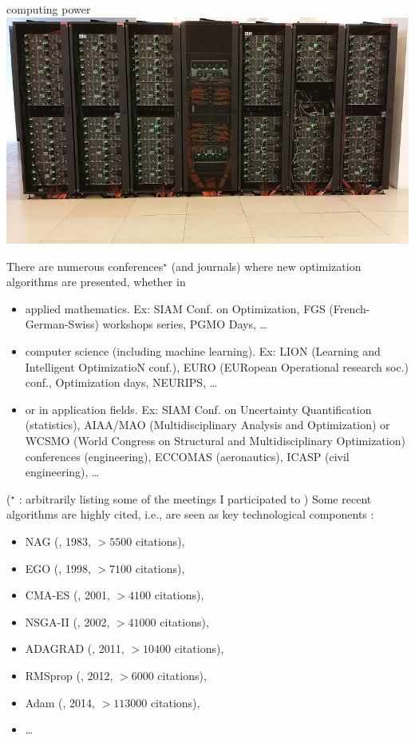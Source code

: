 \documentclass[12pt]{beamer}
\begin{document}
\begin{frame}[allowframebreaks]
\begin{minipage}[t]{0.2\textwidth}
\centering
computing power 
\\\vskip 0.2cm
\includegraphics[width=\textwidth]{Figures/supercomputer.jpg} 
\end{minipage} 
\newpage
There are numerous conferences$^\star$ (and journals) where new optimization algorithms are presented, whether in 
\begin{itemize}
\item applied mathematics. Ex: {\scriptsize SIAM Conf. on Optimization, FGS (French-German-Swiss) workshops series, PGMO Days, \ldots}
\item computer science (including machine learning). Ex: {\scriptsize LION (Learning and Intelligent OptimizatioN conf.), EURO (EURopean Operational research soc.) conf., Optimization days, NEURIPS, \ldots}
\item or in application fields. Ex: {\scriptsize SIAM Conf. on Uncertainty Quantification (statistics), AIAA/MAO (Multidisciplinary Analysis and Optimization) or WCSMO (World Congress on Structural and Multidisciplinary Optimization) conferences (engineering), ECCOMAS (aeronautics), ICASP (civil engineering), \ldots}
\end{itemize}
\hfill($^\star$ {\scriptsize : arbitrarily listing some of the meetings I participated to} )
\newpage
Some recent algorithms are highly cited, i.e., are seen as key technological components : 
\begin{itemize}
\item NAG (\cite{nesterov1983method}, 1983, $>5500$ citations),
\item EGO (\cite{jones1998efficient}, 1998, $>7100$ citations),
\item CMA-ES (\cite{hansen2001completely}, 2001, $>4100$ citations),
\item NSGA-II (\cite{deb2002fast}, 2002, $>41000$ citations),
\item ADAGRAD (\cite{duchi2011adaptive}, 2011, $>10400$ citations),
\item RMSprop (\cite{tieleman2012lecture}, 2012, $>6000$ citations),
\item Adam (\cite{kingma2014adam}, 2014, $>113000$ citations),
\item \ldots
\end{itemize}
\end{frame}
\end{document}

